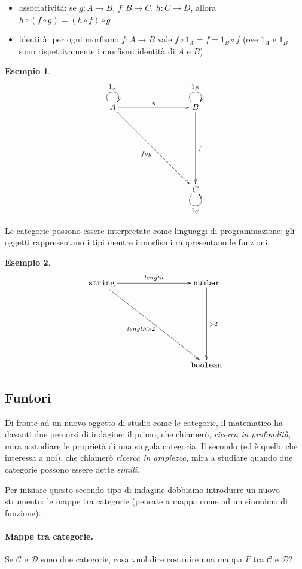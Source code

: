 \documentclass[12pt]{article}
\newtheorem{example}{Esempio}
\begin{document}
\begin{itemize}
  \item associatività: se $g: A \rightarrow B$, $f: B \rightarrow C$, $h: C \rightarrow D$, allora $h \circ (f \circ g) = (h \circ f) \circ g$
  \item identità: per ogni morfismo $f: A \rightarrow B$ vale $f \circ 1_A = f = 1_B \circ f$ (ove $1_A$ e $1_B$ sono rispettivamente i morfismi identità di $A$ e $B$)
\end{itemize}

\begin{example}
\[
\xymatrixrowsep{3cm}
\xymatrixcolsep{3cm}
\xymatrix{
  A \ar@(ul,ur)^{1_A} \ar[r]^g \ar[rd]_{f \circ g} & B \ar@(ul,ur)^{1_B} \ar[d]^f \\
    & C \ar@(dl,dr)_{1_C}
}
\]
\end{example}

Le categorie possono essere interpretate come linguaggi di programmazione: gli oggetti rappresentano i tipi mentre i morfismi
rappresentano le funzioni.

\begin{example}
\[
\xymatrixrowsep{3cm}
\xymatrixcolsep{3cm}
\xymatrix{
  {\texttt{string}} \ar[r]^{length} \ar[rd]_{length > 2} & {\texttt{number}} \ar[d]^{> 2} \\
    & {\texttt{boolean}}
}
\]
\end{example}

\subsection{Funtori}

Di fronte ad un nuovo oggetto di studio come le categorie, il matematico ha davanti due percorsi di indagine: il primo, che chiamerò, \emph{ricerca in profondità},
mira a studiare le proprietà di una singola categoria. Il secondo (ed è quello che interessa a noi), che chiamerò \emph{ricerca in ampiezza},
mira a studiare quando due categorie possono essere dette \emph{simili}.

Per iniziare questo secondo tipo di indagine dobbiamo introdurre un nuovo strumento: le mappe tra categorie
(pensate a mappa come ad un sinonimo di funzione).

\paragraph{Mappe tra categorie.} Se $\mathcal{C}$ e $\mathcal{D}$ sono due categorie, cosa vuol dire costruire una mappa $F$ tra $\mathcal{C}$ e $\mathcal{D}$?
\end{document}
